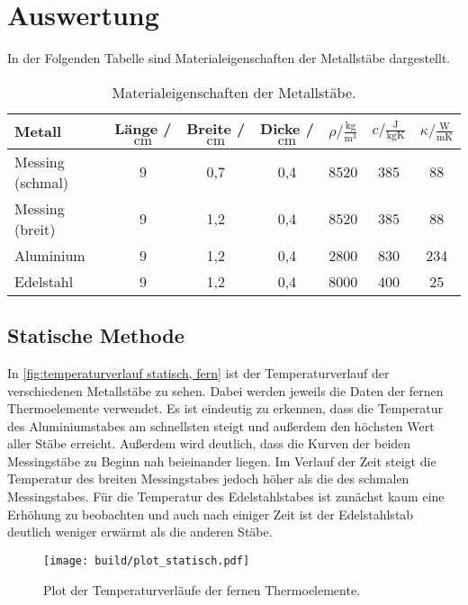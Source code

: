 \section{Auswertung}
\label{sec:Auswertung}
In der Folgenden Tabelle sind Materialeigenschaften der Metallstäbe dargestellt.
\begin{table} [H]
  \centering
  \caption{Materialeigenschaften der Metallstäbe.}
  \label{tab:materialeigenschaften}
  \begin{tabular}{l S[table-format=1.0] S[table-format=1.1] S[table-format=1.1] S[table-format=4.0] S[table-format=3.0] S[table-format=3.0]}
    \toprule
    {Metall} & {Länge / $\unit{\centi\metre}$} & {Breite / $\unit{\centi\metre}$} & %
    {Dicke / $\unit{\centi\metre}$} & {$\rho / \frac{\unit{\kilo\gram}}{\unit{\cubic\metre}}$} &%
     {$c / \frac{\unit{\joule}}{\unit{\kilo\gram\kelvin}}$} & {$\kappa / \frac{\unit{\watt}}{\unit{\metre\kelvin}}$ \cite{czichos}}\\
    \midrule
    Messing (schmal)  & 9 & 0,7 & 0,4 & 8520 & 385 & 88  \\
    Messing (breit)   & 9 & 1,2 & 0,4 & 8520 & 385 & 88  \\
    Aluminium         & 9 & 1,2 & 0,4 & 2800 & 830 & 234 \\
    Edelstahl         & 9 & 1,2 & 0,4 & 8000 & 400 & 25  \\
    \bottomrule
  \end{tabular}
\end{table}

\subsection{Statische Methode}
\label{sec:auswertung statische methode}
In \autoref{fig:temperaturverlauf statisch, fern} ist der Temperaturverlauf der verschiedenen Metallstäbe zu sehen.
Dabei werden jeweils die Daten der fernen Thermoelemente verwendet.
Es ist eindeutig zu erkennen, dass die Temperatur des Aluminiumstabes am schnellsten steigt
und außerdem den höchsten Wert aller Stäbe erreicht. Außerdem wird deutlich, dass die Kurven der beiden Messingstäbe zu Beginn
nah beieinander liegen. Im Verlauf der Zeit steigt die Temperatur des breiten Messingstabes jedoch höher als die des schmalen
Messingstabes. Für die Temperatur des Edelstahlstabes ist zunächst kaum eine Erhöhung zu beobachten und auch nach einiger Zeit
ist der Edelstahlstab deutlich weniger erwärmt als die anderen Stäbe.

\begin{figure} [H]
  \centering
  \texttt{[image: build/plot\_statisch.pdf]}
  \caption{Plot der Temperaturverläufe der fernen Thermoelemente.}
  \label{fig:temperaturverlauf statisch, fern}
\end{figure}

